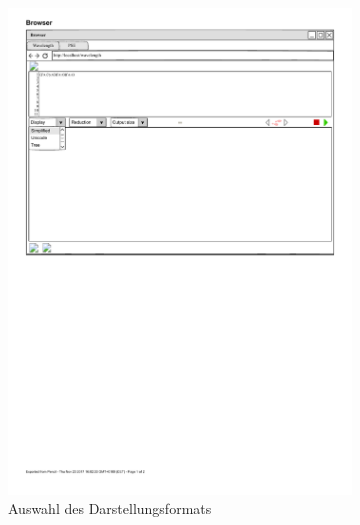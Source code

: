 \documentclass[parskip=full,11pt,twoside]{scrartcl}
\begin{document}
\begin{figure}[H]
	\begin{subfigure}[l]{0.25\textwidth}
	\centering
		\includegraphics{img/displayMenu}
	\caption{\label{fig:display}Auswahl des Darstellungsformats}	
	\end{subfigure}
	\hspace*{\fill}
	\begin{subfigure}[m]{0.25\textwidth}
	\centering

\end{subfigure}
\end{figure}
\end{document}
